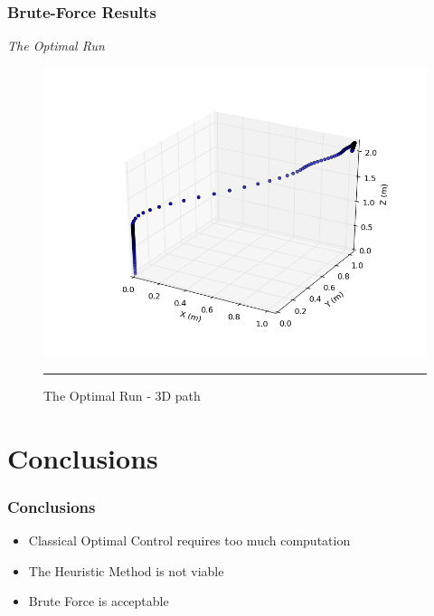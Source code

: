 \documentclass{beamer}
\begin{document}
\begin{frame}

\frametitle{Brute-Force Results}

\textit{The Optimal Run}
\begin{figure}[htbp]
	\centering
		\includegraphics[width=\textwidth]{Figures/optimal_run_3D_path.png}
		\rule{35em}{0.5pt}
	\caption[optimal run 3D path]{The Optimal Run - 3D path}
	\label{fig:optimal run 3D path}
\end{figure}

\end{frame}




\section{Conclusions}%


\begin{frame}

\frametitle{Conclusions}
\begin{itemize}
\item Classical Optimal Control requires too much computation
\item The Heuristic Method is not viable
\item Brute Force is acceptable

\end{itemize}
\end{frame}
\end{document}
